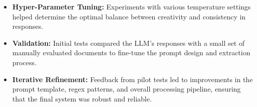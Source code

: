 \documentclass[../main.tex]{subfiles}
\begin{document}
\begin{itemize}
    \item \textbf{Hyper-Parameter Tuning:}
 Experiments with various temperature settings helped determine the optimal balance between creativity and consistency in responses.
    \item \textbf{Validation:}
 Initial tests compared the LLM’s responses with a small set of manually evaluated documents to fine-tune the prompt design and extraction process.
    \item \textbf{Iterative Refinement:}
 Feedback from pilot tests led to improvements in the prompt template, regex patterns, and overall processing pipeline, ensuring that the final system was robust and reliable.
\end{itemize}
\end{document}
